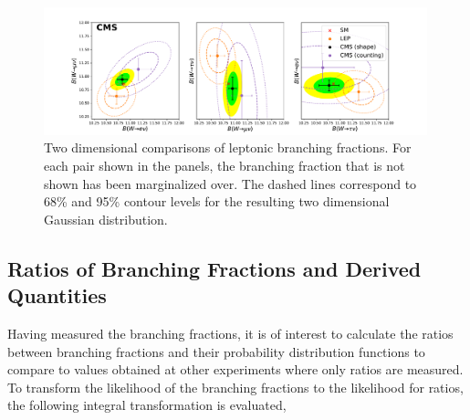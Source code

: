 
\begin{figure}[htb!]
    \begin{center}
    \includegraphics[width=0.99\textwidth]{chapters/Analysis/sectionResult/figures/result_contours_2d_br_dash.pdf}
    \caption{Two dimensional comparisons of leptonic branching
    fractions.  For each pair shown in the panels, the branching
    fraction that is not shown has been marginalized over.  The dashed
    lines correspond to 68\% and 95\% contour levels for the resulting two
    dimensional Gaussian distribution.}
    \label{fig:analysis:result:contours_2D}
    \end{center}
\end{figure}


\FloatBarrier











\subsection{Ratios of Branching Fractions and Derived Quantities}
\label{sec:analysis:result:derived}

Having measured the branching fractions, it is of interest to calculate the
ratios between branching fractions and their probability distribution functions to compare to values obtained
at other experiments where only ratios are measured.  To transform the
likelihood of the branching fractions to the likelihood for ratios, the following
integral transformation is evaluated\cite{10.2307/2334671},


